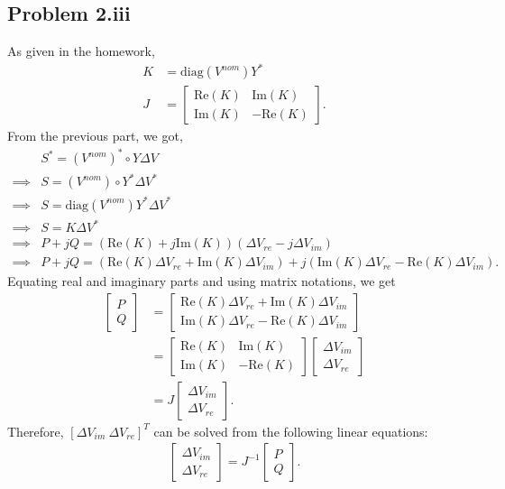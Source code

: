 \subsection*{Problem 2.iii}
As given in the homework,
\begin{align*}
	K &= \text{diag}(V^{nom})Y^*\\
	J &= \begin{bmatrix}
		\text{Re}(K) & \text{Im}(K)\\\text{Im}(K) & -\text{Re}(K)
	\end{bmatrix}.
\end{align*}
From the previous part, we got,
\begin{align*}
	&S^* = (V^{nom})^* \circ Y \Delta V\\
	\implies & S  = (V^{nom}) \circ Y^* \Delta V^*\\
	\implies & S = \text{diag}(V^{nom})Y^* \Delta V^*\\
	\implies & S = K \Delta V^*\\
	\implies & P+jQ = (\text{Re}(K) + j \text{Im}(K))(\Delta V_{re}-j\Delta V_{im})\\
	\implies & P+jQ = (\text{Re}(K)\Delta V_{re} + \text{Im}(K)\Delta V_{im}) + j (\text{Im}(K)\Delta V_{re} - \text{Re}(K)\Delta V_{im}).
\end{align*}
Equating real and imaginary parts and using matrix notations, we get
\begin{align*}
	\begin{bmatrix}
		P\\Q
	\end{bmatrix} & = \begin{bmatrix}
		\text{Re}(K)\Delta V_{re} + \text{Im}(K)\Delta V_{im}\\
		\text{Im}(K)\Delta V_{re} - \text{Re}(K)\Delta V_{im}
	\end{bmatrix}\\
	&= \begin{bmatrix}
		\text{Re}(K) & \text{Im}(K)\\
		\text{Im}(K) & - \text{Re}(K)
	\end{bmatrix} \begin{bmatrix}
		\Delta V_{im}\\\Delta V_{re}
	\end{bmatrix}\\
	&= J \begin{bmatrix}
	\Delta V_{im}\\\Delta V_{re}
	\end{bmatrix}.
\end{align*}
Therefore, $[\Delta V_{im}\ \Delta V_{re}]^T$ can be solved from the following linear equations:
\begin{align*}
	\begin{bmatrix}
	\Delta V_{im}\\\Delta V_{re}
	\end{bmatrix} = J^{-1}\begin{bmatrix}
	P\\Q
	\end{bmatrix}.
\end{align*}
